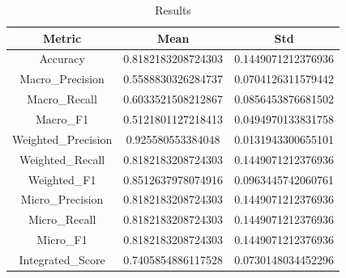 \begin{table}[htbp]
\centering
\caption{Results}
\label{tab:csv}
\small
\setlength{\tabcolsep}{4pt}
\begin{tabular}{|c|c|c|}
\hline
Metric & Mean & Std \\
\hline
Accuracy & 0.8182183208724303 & 0.1449071212376936 \\
Macro_Precision & 0.5588830326284737 & 0.0704126311579442 \\
Macro_Recall & 0.6033521508212867 & 0.0856453876681502 \\
Macro_F1 & 0.5121801127218413 & 0.0494970133831758 \\
Weighted_Precision & 0.925580553384048 & 0.0131943300655101 \\
Weighted_Recall & 0.8182183208724303 & 0.1449071212376936 \\
Weighted_F1 & 0.8512637978074916 & 0.0963445742060761 \\
Micro_Precision & 0.8182183208724303 & 0.1449071212376936 \\
Micro_Recall & 0.8182183208724303 & 0.1449071212376936 \\
Micro_F1 & 0.8182183208724303 & 0.1449071212376936 \\
Integrated_Score & 0.7405854886117528 & 0.0730148034452296 \\
\hline
\end{tabular}
\end{table}